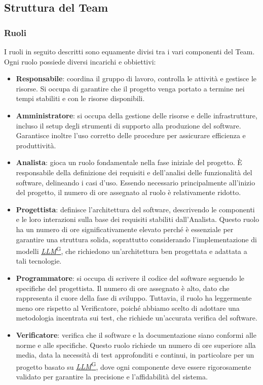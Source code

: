 \documentclass{article}
\begin{document}
    \subsection{Struttura del Team}
        \subsubsection{Ruoli}
        I ruoli in seguito descritti sono equamente divisi tra i vari componenti del Team. Ogni ruolo possiede diversi incarichi e obbiettivi:
        \begin{itemize}
            \item \textbf{Responsabile}: coordina il gruppo di lavoro, controlla le attività e gestisce le risorse. Si occupa di garantire che il progetto venga portato a termine nei tempi stabiliti e con le risorse disponibili.
            \item \textbf{Amministratore}: si occupa della gestione delle risorse e delle infrastrutture, incluso il setup degli strumenti di supporto alla produzione del software. Garantisce inoltre l’uso corretto delle procedure per assicurare efficienza e produttività.
            \item \textbf{Analista}: gioca un ruolo fondamentale nella fase iniziale del progetto. È responsabile della definizione dei requisiti e dell’analisi delle funzionalità del software, delineando i casi d'uso. Essendo necessario principalmente all'inizio del progetto, il numero di ore assegnato al ruolo è relativamente ridotto.
            \item \textbf{Progettista}: definisce l'architettura del software, descrivendo le componenti e le loro interazioni sulla base dei requisiti stabiliti dall'Analista. Questo ruolo ha un numero di ore significativamente elevato perché è essenziale per garantire una struttura solida, soprattutto considerando l’implementazione di modelli \href{https://code7crusaders.github.io/docs/RTB/documentazione_interna/glossario.html#llm-large-language-model}{\emph{LLM}\textsuperscript{G}}, che richiedono un'architettura ben progettata e adattata a tali tecnologie.
            \item \textbf{Programmatore}: si occupa di scrivere il codice del software seguendo le specifiche del progettista. Il numero di ore assegnato è alto, dato che rappresenta il cuore della fase di sviluppo. Tuttavia, il ruolo ha leggermente meno ore rispetto al Verificatore, poiché abbiamo scelto di adottare una metodologia incentrata sui test, che richiede un’accurata verifica del software.
            \item \textbf{Verificatore}: verifica che il software e la documentazione siano conformi alle norme e alle specifiche. Questo ruolo richiede un numero di ore superiore alla media, data la necessità di test approfonditi e continui, in particolare per un progetto basato su \href{https://code7crusaders.github.io/docs/RTB/documentazione_interna/glossario.html#llm-large-language-model}{\emph{LLM}\textsuperscript{G}}, dove ogni componente deve essere rigorosamente validato per garantire la precisione e l’affidabilità del sistema.
        \end{itemize}
\end{document}
